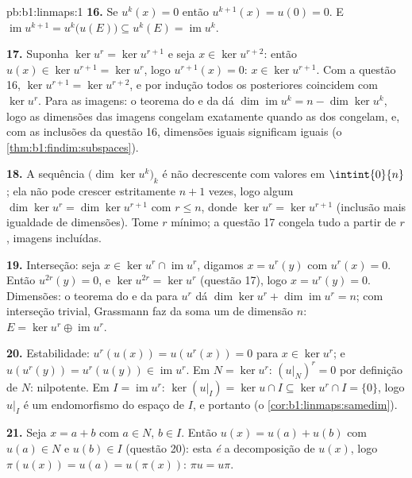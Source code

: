 \begin{solution}{pb:b1:linmaps:1}
\textbf{16.} Se $u^k(x) = 0$ então $u^{k+1}(x) = u(0) = 0$. E $\operatorname{im} u^{k+1} = u^k\bigl(u(E)\bigr) \subseteq
u^k(E) = \operatorname{im} u^k$.

\textbf{17.} Suponha $\ker u^{r} = \ker u^{r+1}$ e seja $x \in
\ker u^{r+2}$: então $u(x) \in \ker u^{r+1} = \ker u^{r}$, logo $u^{r+1}(x) = 0$:
$x \in \ker u^{r+1}$. Com a questão 16, $\ker u^{r+1} = \ker u^{r+2}$, e por indução todos os 
posteriores coincidem com $\ker u^{r}$. Para as imagens: o teorema do
 e da  dá $\dim\operatorname{im} u^k = n - \dim\ker u^k$, logo as dimensões das imagens congelam
exatamente quando as dos  congelam, e, com as inclusões da
questão 16, dimensões iguais significam  iguais
(o \cref{thm:b1:findim:subspaces}).

\textbf{18.} A sequência $\bigl(\dim\ker u^k\bigr)_k$ é não decrescente com valores em
$\intint{0}{n}$; ela não pode crescer estritamente $n + 1$ vezes, logo algum
$\dim\ker u^{r} = \dim\ker
u^{r+1}$ com $r \leq n$, donde $\ker u^{r} = \ker u^{r+1}$ (inclusão mais igualdade de
dimensões). Tome $r$ mínimo; a questão 17 congela tudo a partir de
$r$, imagens incluídas.

\textbf{19.} Interseção: seja $x \in \ker u^{r} \cap
\operatorname{im} u^{r}$, digamos $x = u^{r}(y)$ com $u^{r}(x) =
0$. Então
$u^{2r}(y) = 0$, e $\ker u^{2r} = \ker u^{r}$ (questão 17), logo $x = u^{r}(y) = 0$. Dimensões: o teorema do
 e da  para $u^{r}$ dá $\dim\ker u^{r} + \dim\operatorname{im} u^{r}
= n$; com interseção trivial,
Grassmann faz da soma um  de dimensão $n$: $E = \ker u^{r} \oplus
\operatorname{im} u^{r}$.

\textbf{20.} Estabilidade: $u^{r}(u(x)) = u(u^{r}(x)) = 0$ para $x
\in \ker u^{r}$; e $u(u^{r}(y)) = u^{r}(u(y)) \in
\operatorname{im} u^{r}$. Em $N = \ker u^{r}$:
$(u|_N)^{r} = 0$ por definição de $N$: nilpotente. Em $I = \operatorname{im}
u^{r}$: $\ker(u|_I) = \ker u \cap I \subseteq \ker u^{r} \cap I
= \{0\}$, logo
$u|_I$ é um endomorfismo  do espaço de  $I$,
e portanto  (o \cref{cor:b1:linmaps:samedim}).

\textbf{21.} Seja $x = a + b$ com $a \in N$, $b \in I$. Então $u(x) = u(a) + u(b)$ com
$u(a) \in N$ e $u(b) \in I$ (questão 20): esta \emph{é} a decomposição de $u(x)$,
logo $\pi(u(x)) = u(a) = u(\pi(x))$: $\pi u = u\pi$.


\end{solution}
